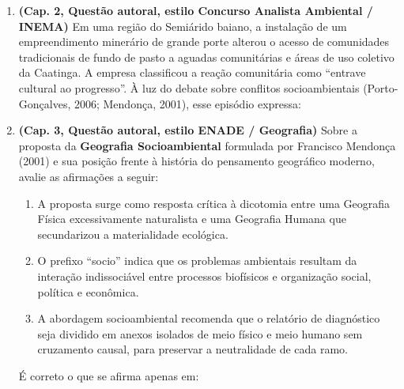 \begin{enumerate}[leftmargin=1.8em, itemsep=6pt]
  \item \textbf{(Cap. 2, Questão autoral, estilo Concurso Analista Ambiental / INEMA)} Em uma região do Semiárido baiano, a instalação de um empreendimento minerário de grande porte alterou o acesso de comunidades tradicionais de fundo de pasto a aguadas comunitárias e áreas de uso coletivo da Caatinga. A empresa classificou a reação comunitária como ``entrave cultural ao progresso''. À luz do debate sobre conflitos socioambientais (Porto-Gonçalves, 2006; Mendonça, 2001), esse episódio expressa:
  \espacoResolucao[1.2cm]

  \item \textbf{(Cap. 3, Questão autoral, estilo ENADE / Geografia)} Sobre a proposta da \textbf{Geografia Socioambiental} formulada por Francisco Mendonça (2001) e sua posição frente à história do pensamento geográfico moderno, avalie as afirmações a seguir:
  \begin{enumerate}[label=\Roman*., leftmargin=2.0em, itemsep=2pt]
    \item A proposta surge como resposta crítica à dicotomia entre uma Geografia Física excessivamente naturalista e uma Geografia Humana que secundarizou a materialidade ecológica.
    \item O prefixo ``socio'' indica que os problemas ambientais resultam da interação indissociável entre processos biofísicos e organização social, política e econômica.
    \item A abordagem socioambiental recomenda que o relatório de diagnóstico seja dividido em anexos isolados de meio físico e meio humano sem cruzamento causal, para preservar a neutralidade de cada ramo.
  \end{enumerate}
  É correto o que se afirma apenas em:
  \espacoResolucao[1.2cm]


\end{enumerate}
